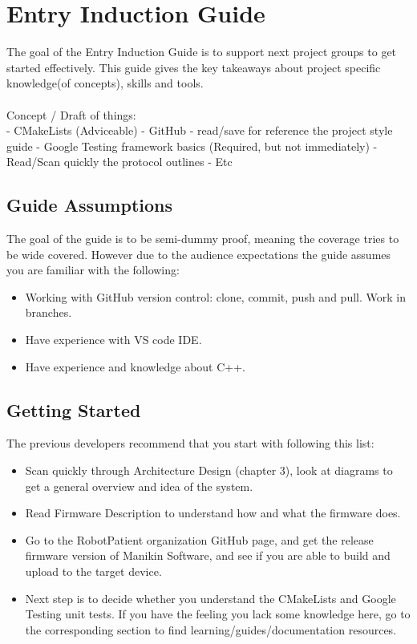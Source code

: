 \chapter{Entry Induction Guide}

The goal of the Entry Induction Guide is to support next project groups to get started effectively. This guide gives the key takeaways about project specific knowledge(of concepts), skills and tools. 
\\ \\ 
Concept / Draft of things: \\
- CMakeLists (Adviceable)
- GitHub
- read/save for reference the project style guide
- Google Testing framework basics (Required, but not immediately)
- Read/Scan quickly the protocol outlines
- Etc

\section{Guide Assumptions}
The goal of the guide is to be semi-dummy proof, meaning the coverage tries to be wide covered. However due to the audience expectations the guide assumes you are familiar with the following:
\begin{itemize}
    \item Working with GitHub version control: clone, commit, push and pull. Work in branches.
    \item Have experience with VS code IDE. 
    \item Have experience and knowledge about C++.
\end{itemize}

\section{Getting Started}
The previous developers recommend that you start with following this list:
\begin{itemize}
  \item Scan quickly through Architecture Design (chapter 3), look at diagrams to get a general overview and idea of the system. 
  \item Read Firmware Description to understand how and what the firmware does.
  \item Go to the RobotPatient organization GitHub page, and get the release firmware version of Manikin Software, and see if you are able to build and upload to the target device.  
  \item Next step is to decide whether you understand the CMakeLists and Google Testing unit tests. If you have the feeling you lack some knowledge here, go to the corresponding section to find learning/guides/documentation resources.
\end{itemize}